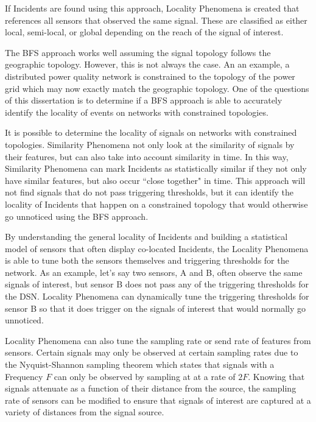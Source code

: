 If Incidents are found using this approach, Locality Phenomena is created that references all sensors that observed the same signal. These are classified as either local, semi-local, or global depending on the reach of the signal of interest.

The BFS approach works well assuming the signal topology follows the geographic topology. However, this is not always the case. An an example, a distributed power quality network is constrained to the topology of the power grid which may now exactly match the geographic topology. One of the questions of this dissertation is to determine if a BFS approach is able to accurately identify the locality of events on networks with constrained topologies.

It is possible to determine the locality of signals on networks with constrained topologies. Similarity Phenomena not only look at the similarity of signals by their features, but can also take into account similarity in time. In this way, Similarity Phenomena can mark Incidents as statistically similar if they not only have similar features, but also occur ``close together" in time. This approach will not find signals that do not pass triggering thresholds, but it can identify the locality of Incidents that happen on a constrained topology that would otherwise go unnoticed using the BFS approach.

By understanding the general locality of Incidents and building a statistical model of sensors that often display co-located Incidents, the Locality Phenomena is able to tune both the sensors themselves and triggering thresholds for the network. As an example, let's say two sensors, A and B, often observe the same signals of interest, but sensor B does not pass any of the triggering thresholds for the DSN. Locality Phenomena can dynamically tune the triggering thresholds for sensor B so that it does trigger on the signals of interest that would normally go unnoticed.

Locality Phenomena can also tune the sampling rate or send rate of features from sensors. Certain signals may only be observed at certain sampling rates due to the Nyquist-Shannon sampling theorem\cite{landau1967sampling} which states that signals with a Frequency $F$ can only be observed by sampling at at a rate of $2F$. Knowing that signals attenuate as a function of their distance from the source, the sampling rate of sensors can be modified to ensure that signals of interest are captured at a variety of distances from the signal source.

